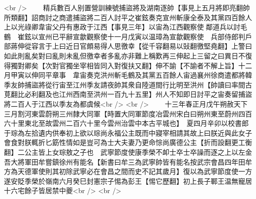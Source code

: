 <br />
　　精兵數百人别置營訓練號捕盜將及湖南逐帥【事見上五月將即亮翻帥所類翻】詔商討之商遣捕盜將二百人討平之崔鉉奏克宣州斬康全泰及其黨四百餘人　上以光祿卿韋宙父丹有惠政于江西【事見三年】以宙為江西觀察使鄰道兵以討毛鶴　崔鉉以宣州已平辭宣歙觀察使十一月戊寅以温璋為宣歙觀察使　兵部侍郎判戶部蔣伸從容言于上曰近日官頗易得人思徼幸【從千容翻易以䜴翻徼堅堯翻】上警曰如此則亂矣對曰亂則未亂但徼幸者多亂亦非難上稱歎再三伸起上三留之曰異日不復得獨對卿矣【次對官獨坐宰相皆同入對復扶又翻】伸不諭【不諭者不解上旨】十二月甲寅以伸同平章事　韋宙奏克洪州斬毛鶴及其黨五百餘人宙過襄州徐商遣都將韓季友帥捕盜將從行宙至江州季友請夜帥其衆自陸道間行比明至洪州【帥讀曰率間古莧翻比必利翻及也江州西南至洪州一百九十五里】州人不知即日討平之宙奏留捕盜將二百人于江西以季友為都虞候<br />
<br />
　　十三年春正月戊午朔赦天下　三月割河東雲蔚朔三州隸大同軍【時置大同軍節度冶雲州宋白曰朔州東至蔚州四百六十里東北至故雲州二百六十里今雲州治雲中本古平城也】　夏四月辛卯以校書郎于琮為左拾遺内供奉初上欲以琮尚永福公主既而中寢宰相請其故上曰朕近與此女子會食對朕輒折匕筯性情如是豈可為士大夫妻乃更命悰尚廣德公主【折而設翻更工衡翻】二公主皆上女琮敖之子也　武寧節度使康季榮不卹士卒士卒譟而逐之上以左金吾大將軍田牟嘗鎮徐州有能名【新書曰牟三為武寧帥皆有能名按武宗會昌四年田牟方為天德軍使則其初除武寧必在會昌之間而史不記其歲月】復以為武寧節度使一方遂安貶季榮於嶺南六月癸巳封憲宗子惕為彭王【惕它歷翻】初上長子鄆王温無寵居十六宅餘子皆居禁中夔<br />
<br />
